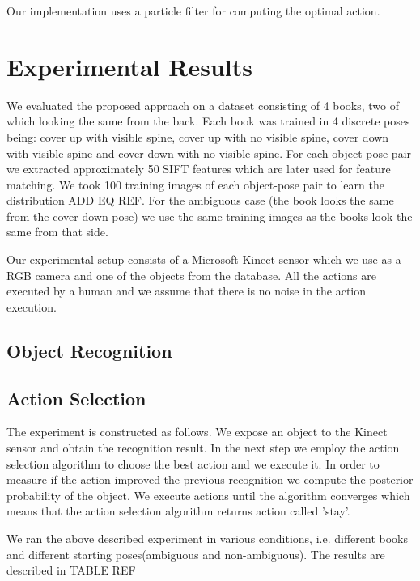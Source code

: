 \documentclass[conference]{IEEEtran}
\begin{document}
        Our implementation uses a particle filter for computing the optimal action.


\section{Experimental Results}

    We evaluated the proposed approach on a dataset consisting of 4 books, two of which looking the same from the back. Each book was trained in 4 discrete poses being: cover up with visible spine, cover up with no visible spine, cover down with visible spine and cover down with no visible spine. For each object-pose pair we extracted approximately 50 SIFT features which are later used for feature matching. We took 100 training images of each object-pose pair to learn the distribution ADD EQ REF. For the ambiguous case (the book looks the same from the cover down pose) we use the same training images as the books look the same from that side.

    Our experimental setup consists of a Microsoft Kinect sensor which we use as a RGB camera and one of the objects from the database. All the actions are executed by a human and we assume that there is no noise in the action execution. 

    \subsection{Object Recognition}

    \subsection{Action Selection}
        The experiment is constructed as follows. We expose an object to the Kinect sensor and obtain the recognition result. In the next step we employ the action selection algorithm to choose the best action and we execute it. In order to measure if the action improved the previous recognition we compute the posterior probability of the object. We execute actions until the algorithm converges which means that the action selection algorithm returns action called 'stay'.

        We ran the above described experiment in various conditions, i.e. different books and different starting poses(ambiguous and non-ambiguous). The results are described in TABLE REF
\end{document}

